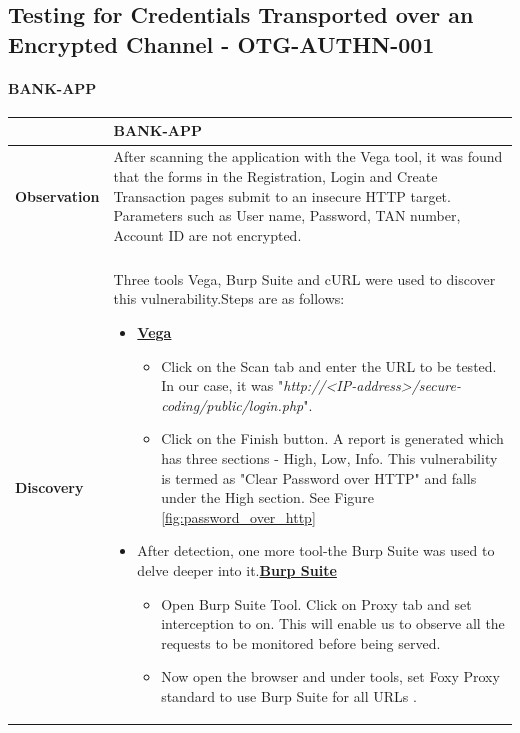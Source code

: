 \subsection{Testing for Credentials Transported over an Encrypted Channel - OTG-AUTHN-001} \label{OTG-AUTHN-001}

\paragraph{BANK-APP} \mbox{}
\begin{longtable*}{p{.20\textwidth} | p{.80\textwidth}}
    \hline
    & \textbf{BANK-APP} \\
    \hline
    \textbf{Observation} &
     After scanning the application with the Vega tool, it was found that the forms in the Registration, Login and Create Transaction pages submit to an insecure HTTP target. Parameters such as User name, Password, TAN number, Account ID are not encrypted. 
    \\\\
    \textbf{Discovery} &
       Three tools Vega, Burp Suite and cURL were used to discover this vulnerability.Steps are as follows:
       \begin{itemize}
       	\item \underline{\textbf{Vega}}
       		\begin{itemize}
       			\item Click on the Scan tab and enter the URL to be tested. In our case, it was "\textit{http://<IP-address>/secure-coding/public/login.php}".
       			
       			\item Click on the Finish button. A report is generated which has three sections - High, Low, Info. This vulnerability is termed as "Clear Password over HTTP" and falls under the High section. See Figure \ref{fig:password_over_http}
       		\end{itemize}
       	\item After detection, one more tool-the Burp Suite was used to delve deeper into it.\underline{\textbf{Burp Suite}}
       		\begin{itemize}
       			\item Open Burp Suite Tool. Click on Proxy tab and set interception to on. This will enable us to observe all the requests to be monitored before being served.
       			
       		  \item Now open the browser and under tools, set Foxy Proxy standard to use Burp Suite for all URLs .
       		  

\end{itemize}
\end{itemize}
\end{longtable*}
